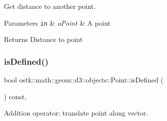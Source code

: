 Get distance to another point. 


\begin{DoxyParams}[1]{Parameters}
\mbox{\tt in}  & {\em a\+Point} & A point \\
\hline
\end{DoxyParams}
\begin{DoxyReturn}{Returns}
Distance to point 
\end{DoxyReturn}
\mbox{\label{classostk_1_1math_1_1geom_1_1d3_1_1objects_1_1_point_ad7e8b8a4f1bae1c6cd0d5895996d65b7}} 
\subsubsection{\texorpdfstring{is\+Defined()}{isDefined()}}
{\footnotesize\ttfamily bool ostk\+::math\+::geom\+::d3\+::objects\+::\+Point\+::is\+Defined (\begin{DoxyParamCaption}{ }\end{DoxyParamCaption}) const\hspace{0.3cm}{\ttfamily [override]}, {\ttfamily [virtual]}}



Addition operator\+: translate point along vector. 


